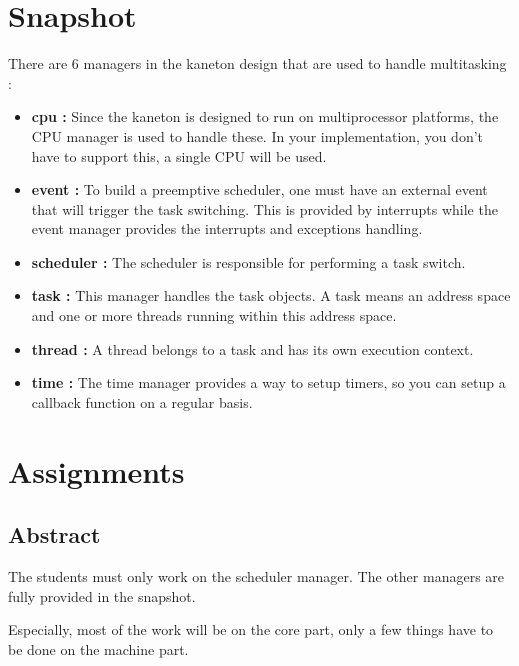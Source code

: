 %
%

\section{Snapshot}

There are 6 managers in the kaneton design that are used to handle multitasking :

\begin{itemize}
\item \textbf{cpu :} Since the kaneton is designed to run on multiprocessor platforms, the CPU manager is used to handle these. In your implementation, you don't have to support this, a single CPU will be used.

\item \textbf{event :} To build a preemptive scheduler, one must have an external event that will trigger the task switching. This is provided by interrupts while the event manager provides the interrupts and exceptions handling.

\item \textbf{scheduler :} The scheduler is responsible for performing a task switch.

\item \textbf{task :} This manager handles the task objects. A task means an address space and one or more threads running within this address space.

\item \textbf{thread :} A thread belongs to a task and has its own execution context.

\item \textbf{time :} The time manager provides a way to setup timers, so you can setup a callback function on a regular basis.

\end{itemize}

%
%

\section{Assignments}

\subsection*{Abstract}

The students must only work on the scheduler manager. The other managers are fully provided in the snapshot.

Especially, most of the work will be on the core part, only a few things have to be done on the machine part.

